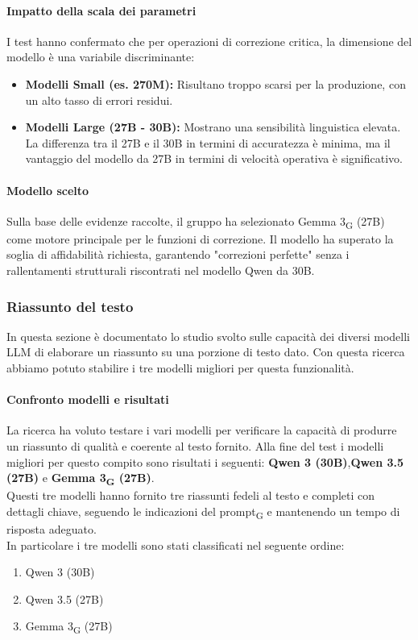 \documentclass[11pt,a4paper]{article}
\newcommand{\gls}[1]{#1\textsubscript{G}}
\begin{document}
\paragraph{Impatto della scala dei parametri}
I test hanno confermato che per operazioni di correzione critica, la dimensione del modello è una variabile discriminante:
\begin{itemize}
    \item \textbf{Modelli Small (es. 270M):} Risultano troppo scarsi per la produzione, con un alto tasso di errori residui.
    \item \textbf{Modelli Large (27B - 30B):} Mostrano una sensibilità linguistica elevata. La differenza tra il 27B e il 30B in termini di accuratezza è minima, ma il vantaggio del modello da 27B in termini di velocità operativa è significativo.
\end{itemize}
\paragraph{Modello scelto}
Sulla base delle evidenze raccolte, il gruppo ha selezionato \gls{Gemma 3} (27B) come motore principale per le funzioni di correzione. Il modello ha superato la soglia di affidabilità richiesta, garantendo "correzioni perfette" senza i rallentamenti strutturali riscontrati nel modello Qwen da 30B.

\subsubsection{Riassunto del testo}
In questa sezione è documentato lo studio svolto sulle capacità dei diversi modelli LLM di elaborare un riassunto su una porzione di testo dato. Con questa ricerca abbiamo potuto stabilire i tre modelli migliori per questa funzionalità.

\paragraph{Confronto modelli e risultati}
La ricerca ha voluto testare i vari modelli per verificare la capacità di produrre un riassunto di qualità e coerente al testo fornito. Alla fine del test i modelli migliori per questo compito sono risultati i seguenti: \textbf{Qwen 3 (30B)},\textbf{Qwen 3.5 (27B)} e \textbf{\gls{Gemma 3} (27B)}.\\
Questi tre modelli hanno fornito tre riassunti fedeli al testo e completi con dettagli chiave, seguendo le indicazioni del \gls{prompt} e mantenendo un tempo di risposta adeguato.\\
In particolare i tre modelli sono stati classificati nel seguente ordine:
\begin{enumerate}
    \item Qwen 3 (30B)
    \item Qwen 3.5 (27B)
    \item \gls{Gemma 3} (27B)
\end{enumerate}
\end{document}
